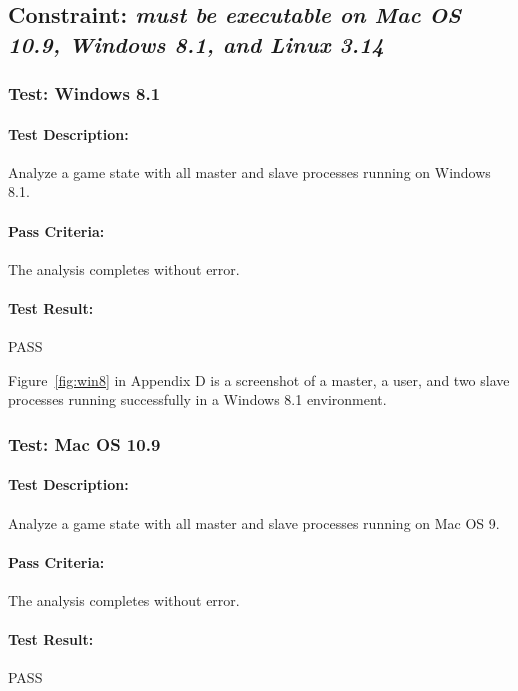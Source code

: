 \documentclass[pdftex,12pt,a4paper]{article}
\begin{document}

\subsection{\textbf{Constraint:} \emph{must be executable on Mac OS 10.9, Windows 8.1, and Linux 3.14}}

\subsubsection{\textbf{Test:} Windows 8.1}

\paragraph{Test Description:} Analyze a game state with all master and slave processes running on Windows 8.1.

\paragraph{Pass Criteria:} The analysis completes without error.

\paragraph{Test Result:} PASS

Figure~\ref{fig:win8} in Appendix D is a screenshot of a master, a user, and two slave processes running successfully in a Windows 8.1 environment.

\subsubsection{\textbf{Test:} Mac OS 10.9}

\paragraph{Test Description:} Analyze a game state with all master and slave processes running on Mac OS 9.

\paragraph{Pass Criteria:} The analysis completes without error.

\paragraph{Test Result:} PASS
\end{document}
